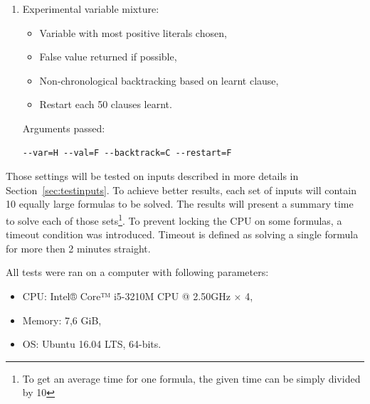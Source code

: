 \documentclass[12pt,english,pdflatex]{aghdpl}
\begin{document}
\begin{enumerate}
\item Experimental variable mixture:
\begin{itemize}
\item Variable with most positive literals chosen,
\item False value returned if possible,
\item Non-chronological backtracking based on learnt clause,
\item Restart each 50 clauses learnt.
\end{itemize}
Arguments passed:
\begin{lstlisting}
--var=H --val=F --backtrack=C --restart=F
\end{lstlisting}

\end{enumerate}

Those settings will be tested on inputs described in more details in Section~\ref{sec:testinputs}. To achieve better results, each set of inputs will contain 10 equally large formulas to be solved. The results will present a summary time to solve each of those sets\footnote{To  get an average time for one formula, the given time can be simply divided by 10}. To prevent locking the CPU on some formulas, a timeout condition was introduced. Timeout is defined as solving a single formula for more then 2 minutes straight.

All tests were ran on a computer with following parameters:
\begin{itemize}
\item CPU: Intel® Core™ i5-3210M CPU @ 2.50GHz × 4,
\item Memory: 7,6 GiB,
\item OS: Ubuntu 16.04 LTS, 64-bits.
\end{itemize}
\end{document}

